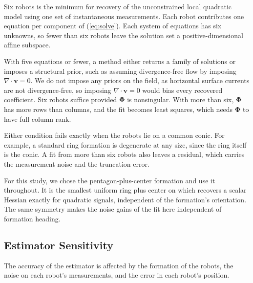\documentclass[lettersize,journal]{IEEEtran}
\begin{document}
Six robots is the minimum for recovery of the unconstrained local
quadratic model using one set of instantaneous measurements. Each robot contributes one equation per component of
(\ref{eq:solve}). Each system of equations has six unknowns, so fewer than six
robots leave the solution set a positive-dimensional affine subspace.

With five equations or fewer, a method either returns a family of solutions or imposes a structural prior, such as assuming
divergence-free flow by imposing $\nabla\cdot\mathbf{v} = 0$. We do not impose any priors on the field, as horizontal surface
currents are not divergence-free, so imposing
$\nabla\cdot\mathbf{v} = 0$ would bias every recovered coefficient.
Six robots suffice provided $\boldsymbol{\Phi}$ is nonsingular. With
more than six, $\boldsymbol{\Phi}$ has more rows than columns, and the fit
becomes least squares, which needs $\boldsymbol{\Phi}$ to have full column rank.

Either condition fails exactly when the robots lie on a common conic.
For example, a standard ring formation is degenerate at any size, since
the ring itself is the conic. A fit from more than six robots also
leaves a residual, which carries the measurement noise and the
truncation error.


For this study, we chose the pentagon-plus-center formation and use it
throughout. It is the smallest uniform ring plus center on which \cite{5}
recovers a scalar Hessian exactly for quadratic signals, independent of
the formation's orientation. The same symmetry makes the noise gains of
the fit here independent of formation heading.


\subsection{Estimator Sensitivity}
\label{sec:sensitivity}

The accuracy of the estimator is affected by the formation of the
robots, the noise on each robot's measurements, and the error in each
robot's position.
\end{document}
